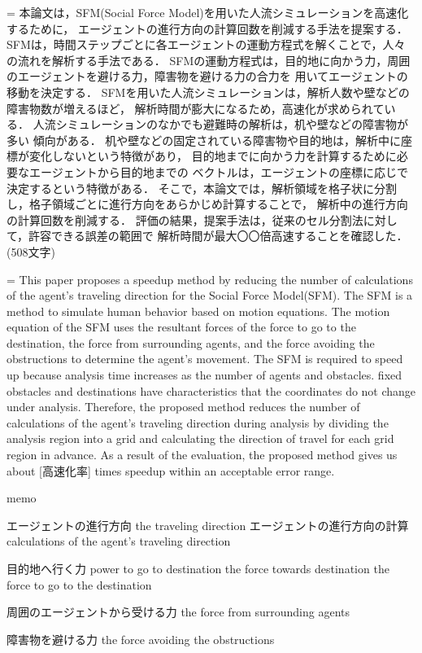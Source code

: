 ={
本論文は，SFM(Social Force Model)を用いた人流シミュレーションを高速化するために，
エージェントの進行方向の計算回数を削減する手法を提案する．
SFMは，時間ステップごとに各エージェントの運動方程式を解くことで，人々の流れを解析する手法である．
SFMの運動方程式は，目的地に向かう力，周囲のエージェントを避ける力，障害物を避ける力の合力を
用いてエージェントの移動を決定する．
SFMを用いた人流シミュレーションは，解析人数や壁などの障害物数が増えるほど，
解析時間が膨大になるため，高速化が求められている．
人流シミュレーションのなかでも避難時の解析は，机や壁などの障害物が多い
傾向がある．
机や壁などの固定されている障害物や目的地は，解析中に座標が変化しないという特徴があり，
目的地までに向かう力を計算するために必要なエージェントから目的地までの
ベクトルは，エージェントの座標に応じで決定するという特徴がある．
そこで，本論文では，解析領域を格子状に分割し，格子領域ごとに進行方向をあらかじめ計算することで，
解析中の進行方向の計算回数を削減する．
評価の結果，提案手法は，従来のセル分割法に対して，許容できる誤差の範囲で
解析時間が最大〇〇倍高速することを確認した．
(508文字)
}%

={
This paper proposes a speedup method by reducing the number of 
calculations of the agent's traveling direction for the Social Force Model(SFM).
The SFM is a method to simulate human behavior based on motion equations.
The motion equation of the SFM uses the resultant forces of the force to go to the destination,
the force from surrounding agents, and the force avoiding the obstructions to determine the agent's
movement.
The SFM is required to speed up because analysis time increases as the number of agents and obstacles.
fixed obstacles and destinations have characteristics that the coordinates do not change under analysis.
Therefore, the proposed method reduces the number of calculations of the agent's traveling direction 
during analysis by dividing the analysis region into a grid and calculating the direction of travel 
for each grid region in advance.
As a result of the evaluation, 
the proposed method gives us about [高速化率] times speedup within an acceptable error range.
}%

memo

エージェントの進行方向
the traveling direction
エージェントの進行方向の計算
calculations of the agent's traveling direction

目的地へ行く力
power to go to destination
the force towards destination
the force to go to the destination

周囲のエージェントから受ける力
the force from surrounding agents

障害物を避ける力
the force avoiding the obstructions

\fi
